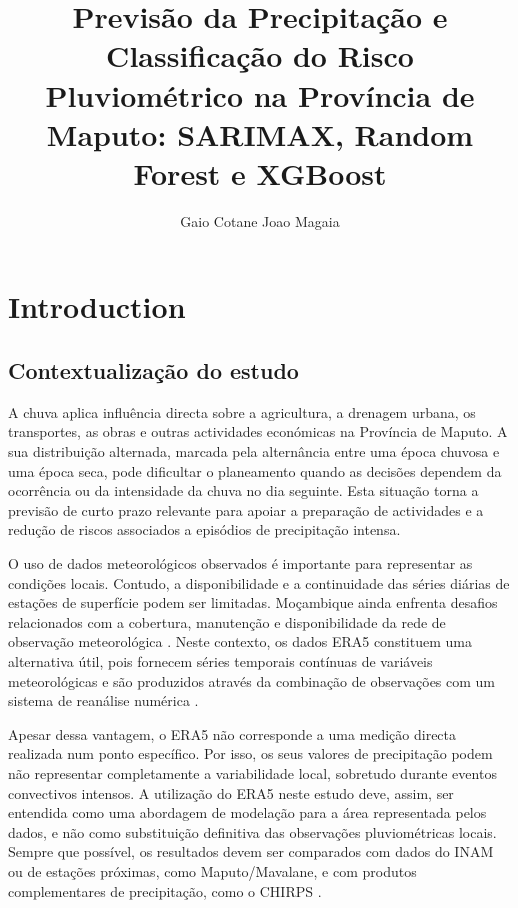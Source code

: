 \documentclass[9pt,twocolumn,twoside,english,portuguese]{opticajnl}
\title{Previsão da Precipitação e Classificação do Risco Pluviométrico na Província de Maputo: SARIMAX, Random Forest e XGBoost}
\author[1,*]{Gaio Cotane Joao Magaia}
\affil[1]{DARTA'ACOS, Consultoria e Estatística, Maputo, Moçambique}
\affil[*]{Autor correspondente: cotanegayo@gmail.com; dea.dartacos@outlook.com}
\date{}
\begin{document}
\vspace{-2.5 em}
\maketitle

\section{Introduction}
\subsection{Contextualização do estudo}

A chuva aplica influência directa sobre a agricultura, a drenagem
urbana, os transportes, as obras e outras actividades económicas na Província
de Maputo. A sua distribuição alternada, marcada pela alternância entre uma
época chuvosa e uma época seca, pode dificultar o planeamento quando as
decisões dependem da ocorrência ou da intensidade da chuva no dia seguinte.
Esta situação torna a previsão de curto prazo relevante para apoiar a
preparação de actividades e a redução de riscos associados a episódios de
precipitação intensa.

O uso de dados meteorológicos observados é importante para representar
as condições locais. Contudo, a disponibilidade e a continuidade das séries diárias de estações de superfície podem ser limitadas. Moçambique ainda
enfrenta desafios relacionados com a cobertura, manutenção e disponibilidade
da rede de observação meteorológica \cite{wmo_mozambique_2024}. Neste
contexto, os dados ERA5 constituem uma alternativa útil, pois fornecem séries
temporais contínuas de variáveis meteorológicas e são produzidos através da
combinação de observações com um sistema de reanálise numérica
\cite{hersbach2020era5}.

Apesar dessa vantagem, o ERA5 não corresponde a uma medição directa realizada num ponto específico. Por isso, os seus valores de precipitação podem não
representar completamente a variabilidade local, sobretudo durante eventos
convectivos intensos. A utilização do ERA5 neste estudo deve, assim, ser
entendida como uma abordagem de modelação para a área representada pelos
dados, e não como substituição definitiva das observações pluviométricas
locais. Sempre que possível, os resultados devem ser comparados com dados do INAM ou de estações próximas, como Maputo/Mavalane, e com produtos
complementares de precipitação, como o CHIRPS \cite{funk2015chirps}.
\end{document}
